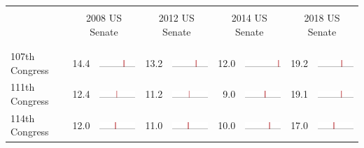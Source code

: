 
\begin{table}
\renewcommand{\arraystretch}{0.7}
 \begin{tabular}{l rm{7em} rm{7em} rm{7em} rm{7em}}
\hline \hline \\

{} & \multicolumn{2}{c}{2008 US Senate} & \multicolumn{2}{c}{2012 US Senate} & \multicolumn{2}{c}{2014 US Senate} & \multicolumn{2}{c}{2018 US Senate} \\

\\ \hline \\
107th Congress         &  14.4 &          \includegraphics[width=7em]{mini_hist/TX_senate_2008_107} &  13.2 &          \includegraphics[width=7em]{mini_hist/TX_senate_2012_107} &  12.0 &          \includegraphics[width=7em]{mini_hist/TX_senate_2014_107} &  19.2 &          \includegraphics[width=7em]{mini_hist/TX_senate_2018_107} \\
111th Congress         &  12.4 &          \includegraphics[width=7em]{mini_hist/TX_senate_2008_111} &  11.2 &          \includegraphics[width=7em]{mini_hist/TX_senate_2012_111} &   9.0 &          \includegraphics[width=7em]{mini_hist/TX_senate_2014_111} &  19.1 &          \includegraphics[width=7em]{mini_hist/TX_senate_2018_111} \\
114th Congress         &  12.0 &          \includegraphics[width=7em]{mini_hist/TX_senate_2008_114} &  11.0 &          \includegraphics[width=7em]{mini_hist/TX_senate_2012_114} &  10.0 &          \includegraphics[width=7em]{mini_hist/TX_senate_2014_114} &  17.0 &          \includegraphics[width=7em]{mini_hist/TX_senate_2018_114} \\

\end{tabular}
\end{table}
